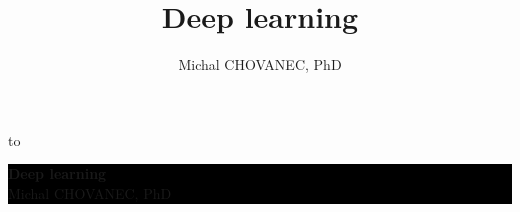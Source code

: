 \documentclass[xcolor=dvipsnames]{beamer}
\title{\color{white} \bf Deep learning}
\author{\color{white} Michal CHOVANEC, PhD}
\date[EURP]{}
\begin{document}
{
    \usebackgroundtemplate
    {
        \vbox to 
    }
    \begin{frame}



    \centering
     \colorbox{black}
     {
        \begin{minipage}{7cm}
           {\LARGE \color{white} \bf Deep learning} \\
           {\LARGE \color{white} Michal CHOVANEC, PhD} \\
       \end{minipage}
     }


    \end{frame}
}
\end{document}
